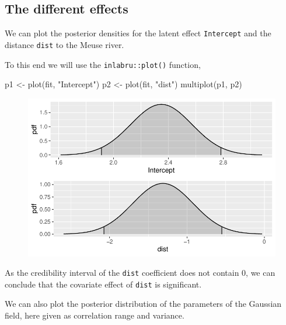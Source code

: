 \documentclass[
  a4paper,
]{article}
\newenvironment{Shaded}{\begin{snugshade}}{\end{snugshade}}
\newcommand{\FunctionTok}[1]{\textcolor[rgb]{0.28,0.35,0.67}{#1}}
\newcommand{\NormalTok}[1]{\textcolor[rgb]{0.00,0.23,0.31}{#1}}
\newcommand{\OtherTok}[1]{\textcolor[rgb]{0.00,0.23,0.31}{#1}}
\newcommand{\StringTok}[1]{\textcolor[rgb]{0.13,0.47,0.30}{#1}}
\begin{document}
\hypertarget{the-different-effects}{%
\subsection{The different effects}\label{the-different-effects}}

We can plot the posterior densities for the latent effect
\texttt{Intercept} and the distance \texttt{dist} to the Meuse river.

To this end we will use the \texttt{inlabru::plot()} function,

\begin{Shaded}
\begin{Highlighting}[]
\NormalTok{p1 }\OtherTok{\textless{}{-}} \FunctionTok{plot}\NormalTok{(fit, }\StringTok{"Intercept"}\NormalTok{)}
\NormalTok{p2 }\OtherTok{\textless{}{-}} \FunctionTok{plot}\NormalTok{(fit, }\StringTok{"dist"}\NormalTok{)}
\FunctionTok{multiplot}\NormalTok{(p1, p2)}
\end{Highlighting}
\end{Shaded}

\begin{figure}[H]

{\centering \includegraphics{pedometron_files/figure-pdf/unnamed-chunk-11-1.pdf}

}

\end{figure}

As the credibility interval of the \texttt{dist} coefficient does not
contain \(0\), we can conclude that the covariate effect of
\texttt{dist} is significant.

We can also plot the posterior distribution of the parameters of the
Gaussian field, here given as correlation range and variance.
\end{document}
